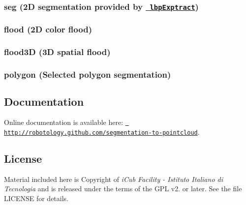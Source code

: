 \subsubsection*{seg (2D segmentation provided by \href{https://github.com/robotology/segmentation/tree/master/lbpExtract}{\texttt{ lbp\+Exptract}})}



\subsubsection*{flood (2D color flood)}



\subsubsection*{flood3D (3D spatial flood)}



\subsubsection*{polygon (Selected polygon segmentation)}



\subsection*{Documentation}

Online documentation is available here\+: \href{http://robotology.github.com/segmentation-to-pointcloud}{\texttt{ http\+://robotology.\+github.\+com/segmentation-\/to-\/pointcloud}}.

\subsection*{License}

Material included here is Copyright of {\itshape i\+Cub Facility -\/ Istituto Italiano di Tecnologia} and is released under the terms of the G\+PL v2. or later. See the file L\+I\+C\+E\+N\+SE for details. 